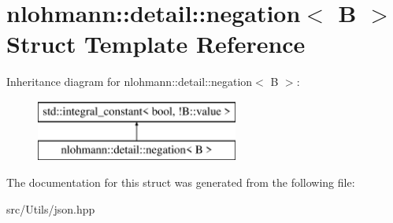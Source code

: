 \hypertarget{structnlohmann_1_1detail_1_1negation}{}\section{nlohmann\+:\+:detail\+:\+:negation$<$ B $>$ Struct Template Reference}
\label{structnlohmann_1_1detail_1_1negation}
Inheritance diagram for nlohmann\+:\+:detail\+:\+:negation$<$ B $>$\+:\begin{figure}[H]
\begin{center}
\leavevmode
\includegraphics[height=2.000000cm]{d1/d91/structnlohmann_1_1detail_1_1negation}
\end{center}
\end{figure}


The documentation for this struct was generated from the following file\+:\begin{DoxyCompactItemize}
\item 
src/\+Utils/json.\+hpp\end{DoxyCompactItemize}
